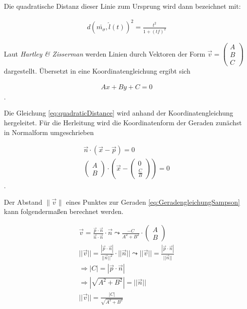 Die quadratische Distanz dieser Linie zum Ursprung wird dann bezeichnet mit:


\begin{gather}
	d(\bar{m_\sigma},\hat{l}(t))^2 = \frac{t^2}{1+(tf)^2} \label{eq:quadraticDistance}
\end{gather}

Laut \textit{Hartley \& Zisserman} \cite{HZ} werden Linien durch Vektoren der Form $\vec{v} = \begin{pmatrix}
A\\B\\C
\end{pmatrix}$ dargestellt. Übersetzt in eine Koordinatengleichung ergibt sich

\begin{gather}
	Ax+By+C = 0
\end{gather}.

Die Gleichung \ref{eq:quadraticDistance} wird anhand der Koordinatengleichung hergeleitet. Für die Herleitung wird die Koordinatenform der Geraden zunächst in Normalform umgeschrieben

%

\begin{gather}
\vec{n}\cdot (\vec{x} - \vec{p}) = 0\\
	\begin{pmatrix}
	A\\B
	\end{pmatrix}
	\cdot
	(\vec{x} - \begin{pmatrix}
		0\\ \frac{C}{B}
	\end{pmatrix}) = 0\label{eq:GeradengleichungSampson}
\end{gather} .

Der Abstand $\parallel \vec{v} \parallel$ eines Punktes zur Geraden \ref{eq:GeradengleichungSampson} kann folgendermaßen berechnet werden.

\begin{gather}
	\vec{v} = \frac{\vec{p} \cdot \vec{n}}{\vec{n} \cdot \vec{n}} \cdot \vec{n}
	\leadsto \frac{-C}{A^2+B^2} \cdot \begin{pmatrix}
	A\\B
	\end{pmatrix}\\
	||\vec{v}|| = \frac{|\vec{p} \cdot \vec{n}|}{||\vec{n}||^2} \cdot ||\vec{n}|| \leadsto ||\vec{v}|| = \frac{|\vec{p} \cdot \vec{n}|}{||\vec{n}||}\\
	\Rightarrow |C| = |\vec{p} \cdot \vec{n}| \\
	\Rightarrow |\sqrt{A^2+B^2}| = ||\vec{n}||\\
	||\vec{v}|| = \frac{|C|}{\sqrt{A^2+B^2}}
\end{gather}

